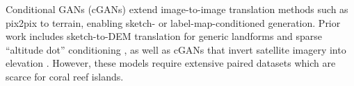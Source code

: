\documentclass{egpubl}
\begin{document}
Conditional GANs (cGANs) extend image-to-image translation methods such as pix2pix \cite{Isola2017} to terrain, enabling sketch- or label-map-conditioned generation. Prior work includes sketch-to-DEM translation for generic landforms \cite{Guerin2017} and sparse “altitude dot” conditioning \cite{Voulgaris2021}, as well as cGANs that invert satellite imagery into elevation \cite{Sisodia2022}. However, these models require extensive paired datasets which are scarce for coral reef islands.




\end{document}
